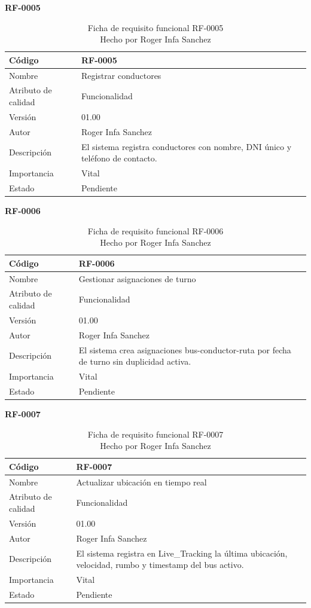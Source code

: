\textbf{RF-0005}
\begin{longtable}{|p{}|p{}|}
\caption{Ficha de requisito funcional RF-0005\\Hecho por Roger Infa Sanchez} \\
\hline
Código & RF-0005 \\
\hline
Nombre & Registrar conductores \\
\hline
Atributo de calidad & Funcionalidad \\
\hline
Versión & 01.00 \\
\hline
Autor & Roger Infa Sanchez \\
\hline
Descripción & El sistema registra conductores con nombre, DNI único y teléfono de contacto. \\
\hline
Importancia & Vital \\
\hline
Estado & Pendiente \\
\hline
\end{longtable}

\textbf{RF-0006}
\begin{longtable}{|p{}|p{}|}
\caption{Ficha de requisito funcional RF-0006\\Hecho por Roger Infa Sanchez} \\
\hline
Código & RF-0006 \\
\hline
Nombre & Gestionar asignaciones de turno \\
\hline
Atributo de calidad & Funcionalidad \\
\hline
Versión & 01.00 \\
\hline
Autor & Roger Infa Sanchez \\
\hline
Descripción & El sistema crea asignaciones bus-conductor-ruta por fecha de turno sin duplicidad activa. \\
\hline
Importancia & Vital \\
\hline
Estado & Pendiente \\
\hline
\end{longtable}

\textbf{RF-0007}
\begin{longtable}{|p{}|p{}|}
\caption{Ficha de requisito funcional RF-0007\\Hecho por Roger Infa Sanchez} \\
\hline
Código & RF-0007 \\
\hline
Nombre & Actualizar ubicación en tiempo real \\
\hline
Atributo de calidad & Funcionalidad \\
\hline
Versión & 01.00 \\
\hline
Autor & Roger Infa Sanchez \\
\hline
Descripción & El sistema registra en Live\_Tracking la última ubicación, velocidad, rumbo y timestamp del bus activo. \\
\hline
Importancia & Vital \\
\hline
Estado & Pendiente \\
\hline
\end{longtable}


